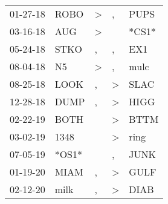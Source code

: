\begin{supertabular}{p{0.07\textwidth}p{0.06\textwidth}p{0.02\textwidth}p{0.02\textwidth}p{0.06\textwidth}}
          01-27-18\textsuperscript{} &           ROBO\textsuperscript{} &     \textgreater &                , &           PUPS\textsuperscript{} \\
          03-16-18\textsuperscript{} &            AUG\textsuperscript{} &     \textgreater &                  &                            *CS1* \\
          05-24-18\textsuperscript{} &           STKO\textsuperscript{} &                , &                , &            EX1\textsuperscript{} \\
          08-04-18\textsuperscript{} &             N5\textsuperscript{} &     \textgreater &                , &           mulc\textsuperscript{} \\
          08-25-18\textsuperscript{} &           LOOK\textsuperscript{} &                , &     \textgreater &           SLAC\textsuperscript{} \\
          12-28-18\textsuperscript{} &           DUMP\textsuperscript{} &                , &     \textgreater &           HIGG\textsuperscript{} \\
          02-22-19\textsuperscript{} &           BOTH\textsuperscript{} &                  &     \textgreater &           BTTM\textsuperscript{} \\
          03-02-19\textsuperscript{} &           1348\textsuperscript{} &                  &     \textgreater &           ring\textsuperscript{} \\
          07-05-19\textsuperscript{} &                            *OS1* &                  &                , &           JUNK\textsuperscript{} \\
          01-19-20\textsuperscript{} &           MIAM\textsuperscript{} &                , &     \textgreater &           GULF\textsuperscript{} \\
          02-12-20\textsuperscript{} &           milk\textsuperscript{} &                , &     \textgreater &           DIAB\textsuperscript{} \\
\end{supertabular}

